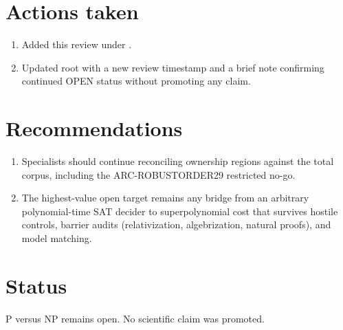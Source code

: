 \documentclass[11pt]{article}
\begin{document}
\section{Actions taken}
\begin{enumerate}
\item Added this review under .
\item Updated root  with a new review timestamp and a brief note confirming continued OPEN status without promoting any claim.
\end{enumerate}

\section{Recommendations}
\begin{enumerate}
\item Specialists should continue reconciling ownership regions against the total corpus, including the ARC-ROBUSTORDER29 restricted no-go.
\item The highest-value open target remains any bridge from an arbitrary polynomial-time SAT decider to superpolynomial cost that survives hostile controls, barrier audits (relativization, algebrization, natural proofs), and model matching.
\end{enumerate}

\section{Status}
P versus NP remains open. No scientific claim was promoted.

\end{document}
